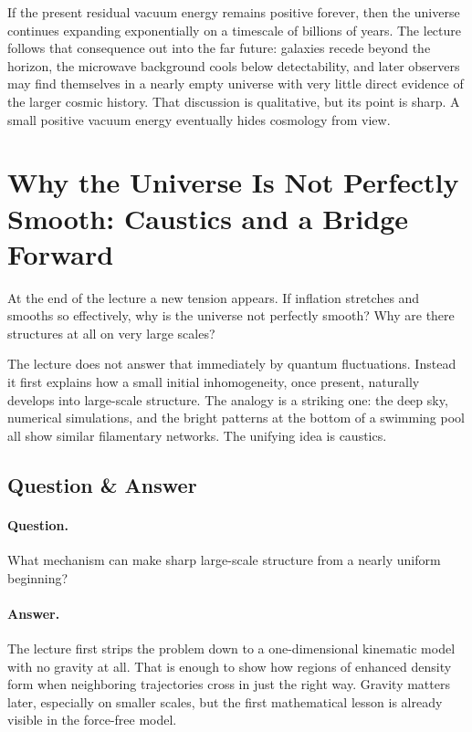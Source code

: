 If the present residual vacuum energy remains positive forever, then the universe continues expanding exponentially on a timescale of billions of years. The lecture follows that consequence out into the far future: galaxies recede beyond the horizon, the microwave background cools below detectability, and later observers may find themselves in a nearly empty universe with very little direct evidence of the larger cosmic history. That discussion is qualitative, but its point is sharp. A small positive vacuum energy eventually hides cosmology from view.

\section{Why the Universe Is Not Perfectly Smooth: Caustics and a Bridge Forward}

At the end of the lecture a new tension appears. If inflation stretches and smooths so effectively, why is the universe not perfectly smooth? Why are there structures at all on very large scales?

The lecture does not answer that immediately by quantum fluctuations. Instead it first explains how a small initial inhomogeneity, once present, naturally develops into large-scale structure. The analogy is a striking one: the deep sky, numerical simulations, and the bright patterns at the bottom of a swimming pool all show similar filamentary networks. The unifying idea is caustics.

\subsection{Question \& Answer}

\paragraph{Question.} What mechanism can make sharp large-scale structure from a nearly uniform beginning?

\paragraph{Answer.} The lecture first strips the problem down to a one-dimensional kinematic model with no gravity at all. That is enough to show how regions of enhanced density form when neighboring trajectories cross in just the right way. Gravity matters later, especially on smaller scales, but the first mathematical lesson is already visible in the force-free model.


